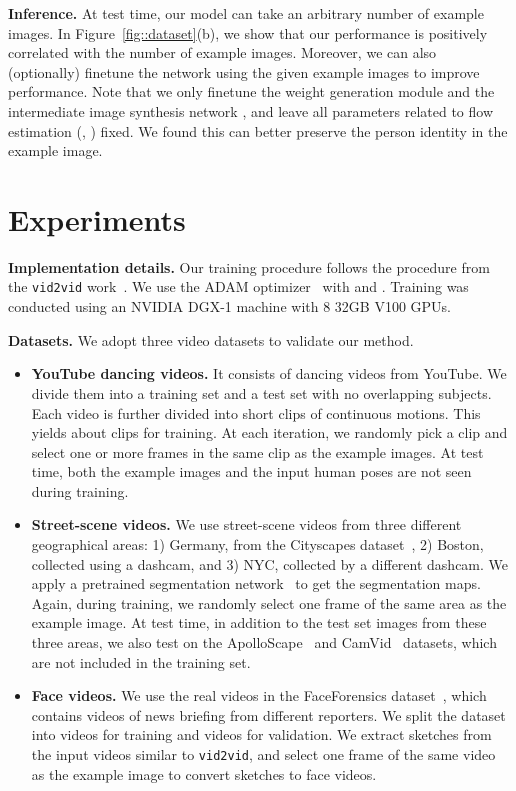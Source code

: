 \documentclass{article}
\newcommand{\vidtovid}{{\texttt{vid2vid}}\xspace}
\begin{document}
{\bf Inference.} At test time, our model can take an arbitrary number of example images. In Figure~\ref{fig::dataset}(b), we show that our performance is positively correlated with the number of example images. Moreover, we can also (optionally) finetune the network using the given example images to improve performance. Note that we only finetune the weight generation module  and the intermediate image synthesis network , and leave all parameters related to flow estimation (, ) fixed. We found this can better preserve the person identity in the example image.
  \vspace{-2mm}
\section{Experiments}\label{sec::exp} \vspace{-2mm}

{\bf Implementation details.} Our training procedure follows the procedure from the \vidtovid work~\cite{wang2018video}. We use the ADAM optimizer~\cite{kingma2014adam} with  and . Training was conducted using an NVIDIA DGX-1 machine with 8 32GB V100 GPUs. 

{\bf Datasets.} We adopt three video datasets to validate our method.
\begin{itemize}[leftmargin=5mm,topsep=0pt]
\item {\bf YouTube dancing videos.} It consists of  dancing videos from YouTube. We divide them into a training set and a test set with no overlapping subjects. Each video is further divided into short clips of continuous motions. This yields about  clips for training. At each iteration, we randomly pick a clip and select one or more frames in the same clip as the example images. At test time, both the example images and the input human poses are not seen during training.

\item {\bf Street-scene videos.} We use street-scene videos from three different geographical areas: 1) Germany, from the Cityscapes dataset~\cite{Cordts2016cityscapes}, 2) Boston, collected using a dashcam, and 3) NYC, collected by a different dashcam. We apply a pretrained segmentation network~\cite{wu2018cgnet} to get the segmentation maps. Again, during training, we randomly select one frame of the same area as the example image. At test time, in addition to the test set images from these three areas, we also test on the ApolloScape~\cite{huang2018apolloscape} and CamVid~\cite{brostow2008camvid} datasets, which are not included in the training set. 


\item {\bf Face videos.} We use the real videos in the FaceForensics dataset~\cite{rossler2018faceforensics}, which contains
 videos of news briefing from different reporters. We split the dataset into  videos for training and  videos for validation. 
We extract sketches from the input videos similar to \vidtovid, and select one frame of the same video as the example image to convert sketches to face videos. 

\end{itemize}
\end{document}

